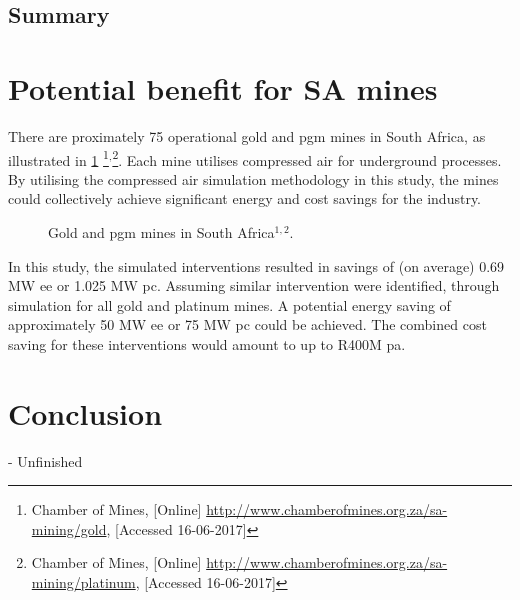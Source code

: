 	\subsection{Summary}
\clearpage
\section{Potential benefit for SA mines}
There are proximately 75 operational gold and \gls{pgm} mines in South Africa, as illustrated in \cref{fig: Mine map} \footnote{ Chamber of Mines, [Online] \url{http://www.chamberofmines.org.za/sa-mining/gold}, [Accessed 16-06-2017]}$^,$\footnote{ Chamber of Mines, [Online] \url{http://www.chamberofmines.org.za/sa-mining/platinum}, [Accessed 16-06-2017]}. Each mine utilises compressed air for underground processes. By utilising the compressed air simulation methodology in this study, the mines could collectively achieve significant energy and cost savings for the industry. 
\par 

	\begin{figure}[h]
		\centering
		\caption[Gold and PGM mines in South Africa]{Gold and \gls{pgm} mines in South Africa$^{1,2}$.}
		\label{fig: Mine map}
	\end{figure}
In this study, the simulated interventions resulted in savings of (on average) 0.69 MW \gls{ee} or 1.025 MW \gls{pc}. Assuming similar intervention were identified, through simulation for all gold and platinum mines. A potential energy saving of approximately 50 MW \gls{ee} or  75 MW \gls{pc} could be achieved. The combined cost saving for these interventions would amount to up to R400M \gls{pa}.
\clearpage
\section{Conclusion}
- Unfinished
